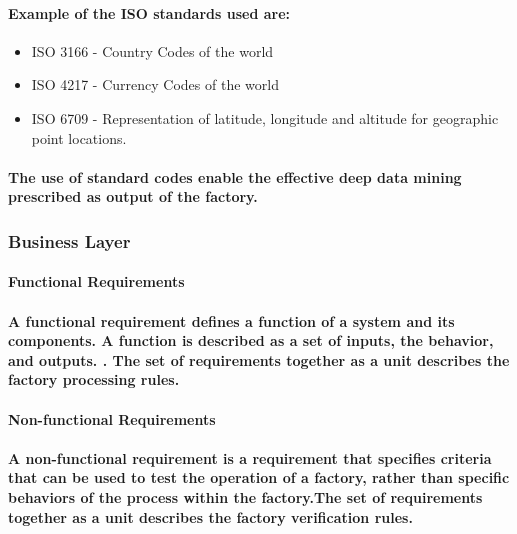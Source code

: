 \documentclass{acm_proc_article-sp}
\begin{document}
\paragraph{Example of the ISO standards used are:}
\begin{itemize}
\item{ISO 3166 - Country Codes of the world}
\item{ISO 4217 - Currency Codes of the world}
\item{ISO 6709 - Representation of latitude, longitude and altitude for geographic point locations.}
\end{itemize}
\paragraph{The use of standard codes enable the effective deep data mining prescribed as output of the factory.}
\subsubsection{Business Layer}
\paragraph{Functional Requirements}
\paragraph{A functional requirement defines a function of a system and its components. A function is described as a set of inputs, the behavior, and outputs. \cite{roman1985taxonomy}. The set of requirements together as a unit describes the factory processing rules.}
\paragraph{Non-functional Requirements}
\paragraph{A non-functional requirement is a requirement that specifies criteria that can be used to test the operation of a factory, rather than specific behaviors of the process within the factory.The set of requirements together as a unit describes the factory verification rules.}
\end{document}
